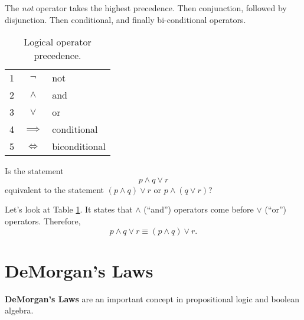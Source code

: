 \begin{defn}
The \emph{not} operator takes the highest precedence.
Then conjunction, followed by disjunction.
Then conditional, and finally bi-conditional operators.
\begin{table}[H]
  \centering
    \begin{tabular}{r|cl}
      1 & $\neg$      &not\\
      2 & $\land$     &and \\
      3 & $\lor$      & or \\
      4 & $\implies$  & conditional \\
      5 & $\iff$      &biconditional
    \end{tabular}
  \caption{Logical operator precedence.}
  \label{tab:precedence}
\end{table}
\begin{ex}
  Is the statement \[ p \land q \lor r \] equivalent to the statement
  \( ( p \land q ) \lor r\)
  or \( p \land (q \lor r)\)?
  \begin{sol}
    Let's look at Table \ref{tab:precedence}.
    It states that $\land$ (``and'') operators come before $\lor$ (``or'') operators.
    Therefore,
    \[ p \land q \lor r \equiv (p \land q) \lor r \text{.}\]
  \end{sol}
\end{ex}

\section{DeMorgan's Laws}
\textbf{DeMorgan's Laws} are an important concept in propositional logic and boolean algebra.


\end{defn}
